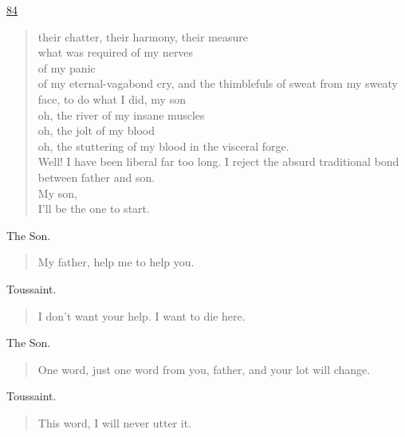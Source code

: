 \documentclass[letterpaper,article,12pt,oneside,notitlepage]{memoir}
\begin{document}
\clearpage

\href{http://cesaire.elotroalex.com/chiens/chiens/p084.html}{84}

\begin{verse}
their chatter, their harmony, their measure \\
what was required of my nerves \\
of my panic \\
of my eternal-vagabond cry, and the thimblefuls of sweat from my sweaty face, to do what I did, my son  \\
oh, the river of my insane muscles \\
oh, the jolt of my blood \\
oh, the stuttering of my blood in the visceral forge.   \\
Well! I have been liberal far too long. I reject the absurd traditional bond between father and son. \\
My son, \\
I'll be the one to start. \\
\end{verse}

\begin{center}The Son.\end{center}

\begin{verse}
My father, help me to help you. \\
\end{verse}

\begin{center}Toussaint.\end{center}

\begin{verse}
I don't want your help. I want to die here. \\
\end{verse}

\begin{center}The Son.\end{center}

\begin{verse}
One word, just one word from you, father, and your lot will change. \\
\end{verse}

\begin{center}Toussaint.\end{center}

\begin{verse}
This word, I will never utter it. \\
\end{verse}
\end{document}

